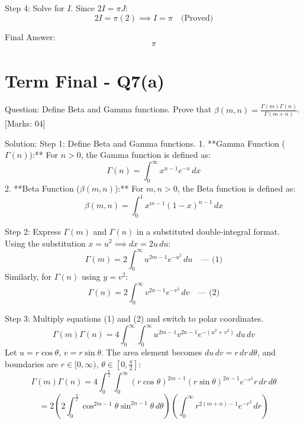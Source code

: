 \documentclass[11pt, a4paper]{article}
\begin{document}
Step 4: Solve for $I$.
Since $2I = \pi J$:
\[
2I = \pi (2) \implies I = \pi \quad \text{(Proved)}
\]

Final Answer:
\[
\boxed{\pi}
\]





\section*{Term Final - Q7(a)}

Question:
Define Beta and Gamma functions. Prove that $\beta(m, n) = \frac{\Gamma(m)\Gamma(n)}{\Gamma(m+n)}$. [Marks: 04]

Solution:
Step 1: Define Beta and Gamma functions.
1. **Gamma Function ($\Gamma(n)$):** For $n > 0$, the Gamma function is defined as:
\[
\Gamma(n) = \int_{0}^{\infty} x^{n-1} e^{-x} \, dx
\]
2. **Beta Function ($\beta(m, n)$):** For $m, n > 0$, the Beta function is defined as:
\[
\beta(m, n) = \int_{0}^{1} x^{m-1} (1-x)^{n-1} \, dx
\]

Step 2: Express $\Gamma(m)$ and $\Gamma(n)$ in a substituted double-integral format.
Using the substitution $x = u^2 \implies dx = 2u \, du$:
\[
\Gamma(m) = 2 \int_{0}^{\infty} u^{2m-1} e^{-u^2} \, du \quad \text{--- (1)}
\]
Similarly, for $\Gamma(n)$ using $y = v^2$:
\[
\Gamma(n) = 2 \int_{0}^{\infty} v^{2n-1} e^{-v^2} \, dv \quad \text{--- (2)}
\]

Step 3: Multiply equations (1) and (2) and switch to polar coordinates.
\[
\Gamma(m)\Gamma(n) = 4 \int_{0}^{\infty} \int_{0}^{\infty} u^{2m-1} v^{2n-1} e^{-(u^2 + v^2)} \, du \, dv
\]
Let $u = r \cos \theta$, $v = r \sin \theta$. The area element becomes $du \, dv = r \, dr \, d\theta$, and boundaries are $r \in [0, \infty)$, $\theta \in [0, \frac{\pi}{2}]$:
\[
\Gamma(m)\Gamma(n) = 4 \int_{0}^{\frac{\pi}{2}} \int_{0}^{\infty} (r \cos \theta)^{2m-1} (r \sin \theta)^{2n-1} e^{-r^2} r \, dr \, d\theta
\]
\[
= 2 \left( 2 \int_{0}^{\frac{\pi}{2}} \cos^{2m-1}\theta \sin^{2n-1}\theta \, d\theta \right) \left( \int_{0}^{\infty} r^{2(m+n)-1} e^{-r^2} \, dr \right)
\]
\end{document}
